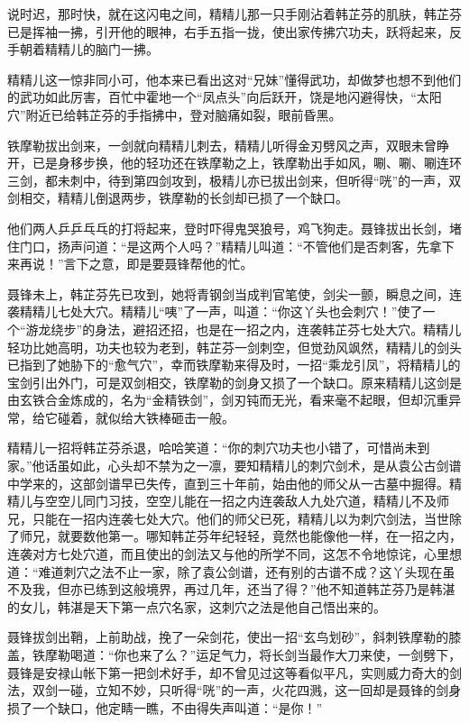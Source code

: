 \documentclass[12pt,oneside]{book}
\begin{document}
说时迟，那时快，就在这闪电之间，精精儿那一只手刚沾着韩芷芬的肌肤，韩芷芬已是挥袖一拂，引开他的眼神，右手五指一拢，使出家传拂穴功夫，跃将起来，反手朝着精精儿的脑门一拂。

精精儿这一惊非同小可，他本来已看出这对``兄妹''懂得武功，却做梦也想不到他们的武功如此厉害，百忙中霍地一个``凤点头''向后跃开，饶是地闪避得快，``太阳穴''附近已给韩芷芬的手指拂中，登对脑痛如裂，眼前昏黑。

铁摩勒拔出剑来，一剑就向精精儿刺去，精精儿听得金刃劈风之声，双眼未曾睁开，已是身移步换，他的轻功还在铁摩勒之上，铁摩勒出手如风，唰、唰、唰连环三剑，都未刺中，待到第四剑攻到，极精儿亦已拔出剑来，但听得``咣''的一声，双剑相交，精精儿倒退两步，铁摩勒的长剑却已损了一个缺口。

他们两人乒乒乓乓的打将起来，登时吓得鬼哭狼号，鸡飞狗走。聂锋拔出长剑，堵住门口，扬声问道：``是这两个人吗？''精精儿叫道：``不管他们是否刺客，先拿下来再说！''言下之意，即是要聂锋帮他的忙。

聂锋未上，韩芷芬先已攻到，她将青钢剑当成判官笔使，剑尖一颤，瞬息之间，连袭精精儿七处大穴。精精儿``咦''了一声，叫道：``你这丫头也会刺穴！''使了一个``游龙绕步''的身法，避招还招，也是在一招之内，连袭韩芷芬七处大穴。精精儿轻功比她高明，功夫也较为老到，韩芷芬一剑刺空，但觉劲风飒然，精精儿的剑头已指到了她胁下的``愈气穴''，幸而铁摩勒来得及时，一招``乘龙引凤''，将精精儿的宝剑引出外门，可是双剑相交，铁摩勒的剑身又损了一个缺口。原来精精儿这剑是由玄铁合金炼成的，名为``金精铁剑''，剑刃钝而无光，看来毫不起眼，但却沉重异常，给它碰着，就似给大铁棒砸击一般。

精精儿一招将韩芷芬杀退，哈哈笑道：``你的刺穴功夫也小错了，可惜尚未到家。''他话虽如此，心头却不禁为之一凛，要知精精儿的刺穴剑术，是从袁公古剑谱中学来的，这部剑谱早已失传，直到三十年前，始由他的师父从一古墓中掘得。精精儿与空空儿同门习技，空空儿能在一招之内连袭敌人九处穴道，精精儿不及师兄，只能在一招内连袭七处大穴。他们的师父已死，精精儿以为刺穴剑法，当世除了师兄，就要数他第一。哪知韩芷芬年纪轻轻，竟然也能像他一样，在一招之内，连袭对方七处穴道，而且使出的剑法又与他的所学不同，这怎不令地惊诧，心里想道：``难道刺穴之法不止一家，除了袁公剑谱，还有别的古谱不成？这丫头现在虽不及我，但亦已练到这般境界，再过几年，还当了得？''他不知道韩芷芬乃是韩湛的女儿，韩湛是天下第一点穴名家，这刺穴之法是他自己悟出来的。

聂锋拔剑出鞘，上前助战，挽了一朵剑花，使出一招``玄鸟划砂''，斜刺铁摩勒的膝盖，铁摩勒喝道：``你也来了么？''运足气力，将长剑当最作大刀来使，一剑劈下，聂锋是安禄山帐下第一把剑术好手，却不曾见过这等看似平凡，实则威力奇大的剑法，双剑一碰，立知不妙，只听得``咣''的一声，火花四溅，这一回却是聂锋的剑身损了一个缺口，他定睛一瞧，不由得失声叫道：``是你！''
\end{document}
